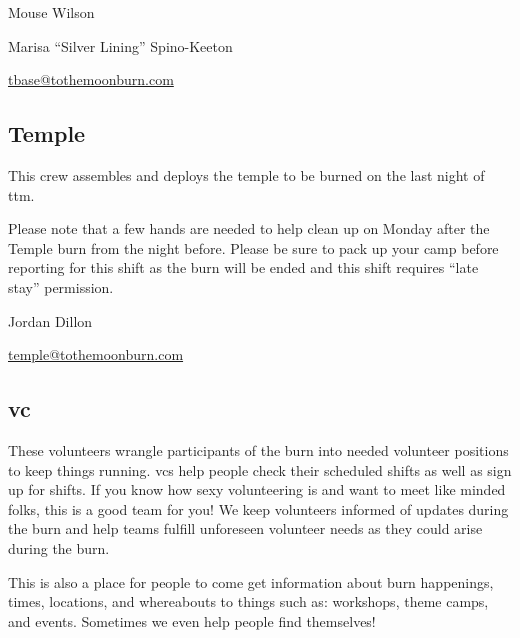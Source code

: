\begin{description}[leftmargin=6em,noitemsep,style=nextline]
   \item[Lead:] Mouse Wilson
   \item[Co-leads:] Marisa ``Silver Lining'' Spino-Keeton
   \item[Contact:] \url{tbase@tothemoonburn.com}
\end{description}


\subsection*{Temple}
This crew assembles and deploys the \gls{temple} to be burned on the last night of \gls{ttm}.

Please note that a few hands are needed to help clean up on Monday after the Temple burn from the night before. Please be sure to pack up your camp before reporting for this shift as the burn will be ended and this shift requires ``late stay'' permission.

\begin{description}[leftmargin=6em,noitemsep,style=nextline]
   \item[Lead:] Jordan Dillon
   \item[Contact:] \url{temple@tothemoonburn.com}
\end{description}



\subsection*{\acrlong{vc}}
These volunteers wrangle participants of the burn into needed volunteer positions to keep things running. \glspl{vc} help people check their scheduled shifts as well as sign up for shifts. If you know how sexy volunteering is and want to meet like minded folks, this is a good team for you! We keep volunteers informed of updates during the burn and help teams fulfill unforeseen volunteer needs as they could arise during the burn.

This is also a place for people to come get information about burn happenings, times, locations, and whereabouts to things such as: workshops, theme camps, and events. Sometimes we even help people find themselves!

